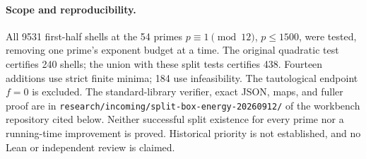 \documentclass[10pt,a4paper]{article}
\begin{document}
\paragraph{Scope and reproducibility.}
All 9531 first-half shells at the 54 primes $p\equiv1\pmod{12}$,
$p\le1500$, were tested, removing one prime's exponent budget at a time.
The original quadratic test certifies 240 shells; the union with these
split tests certifies 438. Fourteen additions use strict finite minima;
184 use infeasibility. The tautological endpoint $f=0$ is excluded.
The standard-library verifier, exact JSON, maps, and fuller proof are in
\texttt{research/incoming/split-box-energy-20260912/} of the workbench
repository cited below. Neither successful split existence for every
prime nor a running-time improvement is proved. Historical priority is
not established, and no Lean or independent review is claimed.

\begingroup\small

\endgroup
\end{document}
